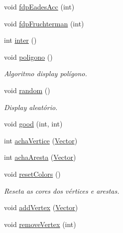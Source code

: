 \begin{DoxyCompactItemize}
void \mbox{\hyperlink{classGraphDisplay_a982c8bb3e300720840a6e1fbd877f5ba}{fdp\+Eades\+Acc}} (int)
\item 
void \mbox{\hyperlink{classGraphDisplay_aaf2ed129c6647b38b0170133ae4f0823}{fdp\+Fruchterman}} (int)
\item 
int \mbox{\hyperlink{classGraphDisplay_aa9300be5d20b62596cf709223a3dd67d}{inter}} ()
\item 
\mbox{\label{classGraphDisplay_a3dda94c25e4e6190700f2fa248cabca7}} 
void \mbox{\hyperlink{classGraphDisplay_a3dda94c25e4e6190700f2fa248cabca7}{poligono}} ()
\begin{DoxyCompactList}\small\item\em Algoritmo display polígono. \end{DoxyCompactList}\item 
\mbox{\label{classGraphDisplay_a914629b25bf3322736df48bc4f9771a5}} 
void \mbox{\hyperlink{classGraphDisplay_a914629b25bf3322736df48bc4f9771a5}{random}} ()
\begin{DoxyCompactList}\small\item\em Display aleatório. \end{DoxyCompactList}\item 
void \mbox{\hyperlink{classGraphDisplay_a27d6e383e51648eff72a3ac43abc5c0c}{good}} (int, int)
\item 
int \mbox{\hyperlink{classGraphDisplay_a8a07eca019e47afd54a207dc66195b3f}{acha\+Vertice}} (\mbox{\hyperlink{classVector}{Vector}})
\item 
int \mbox{\hyperlink{classGraphDisplay_ad14587ecf7f118cf8d071231de2e5809}{acha\+Aresta}} (\mbox{\hyperlink{classVector}{Vector}})
\item 
\mbox{\label{classGraphDisplay_a1c6b7b9966a82c8b62983221f5b43dfa}} 
void \mbox{\hyperlink{classGraphDisplay_a1c6b7b9966a82c8b62983221f5b43dfa}{reset\+Colors}} ()
\begin{DoxyCompactList}\small\item\em Reseta as cores dos vértices e arestas. \end{DoxyCompactList}\item 
void \mbox{\hyperlink{classGraphDisplay_aaa444bf8a296fb97a054c48e8e4a826f}{add\+Vertex}} (\mbox{\hyperlink{classVector}{Vector}})
\item 
void \mbox{\hyperlink{classGraphDisplay_adc84fa190931d2a2f73463ed211e0b71}{remove\+Vertex}} (int)

\end{DoxyCompactItemize}

